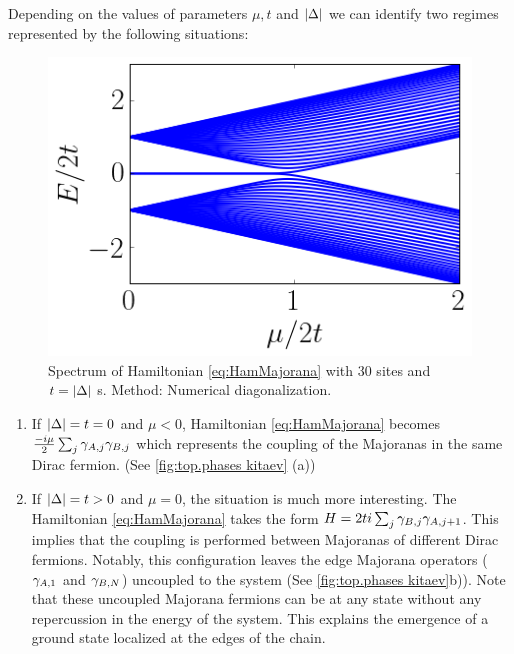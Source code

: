 Depending on the values of parameters $\mu, t$ and $\vert \Delta \vert$ we can identify two regimes represented by the following situations:





\begin{figure}[t]
    \centering
    \includegraphics[scale=0.65]{IMAGES/Majorana/Spectrum.png}
    \caption{ \label{fig:KitaevSpec} Spectrum of Hamiltonian \ref{eq:HamMajorana} with $30$ sites and $t=\vert \Delta \vert$ s. Method: Numerical diagonalization. \protect {} }
\end{figure}


\begin{enumerate}

  \item If $\vert \Delta \vert = t = 0$ and $\mu <0$, Hamiltonian \eqref{eq:HamMajorana} becomes $\frac{-i\mu}{2} \sum_{j} \gamma_{A,j}\gamma_{B,j}$ which represents the coupling of the Majoranas in the same Dirac fermion. (See \ref{fig:top.phases kitaev} (a))

  \item If $\vert \Delta \vert = t > 0$ and $\mu =0$, the situation is much more interesting. The Hamiltonian \eqref{eq:HamMajorana} takes the form $H = 2ti\sum_{j}  \gamma_{B,j}\gamma_{A,j+1} $. This implies that the coupling is performed between  Majoranas of different Dirac fermions. Notably, this configuration leaves the edge Majorana operators ($\gamma_{A,1}$ and $\gamma_{B,N}$) uncoupled to the system (See \ref{fig:top.phases kitaev}b)). Note that these uncoupled Majorana fermions can be at any state without any  repercussion in the energy of the system. This explains the emergence of a  ground state localized at the edges of the chain. 
\end{enumerate}

